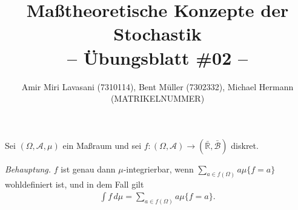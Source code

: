 \documentclass[10pt]{article}
\newcommand{\R}{\mathbb{R}}
\newcommand{\beh}{\textit{Behauptung. }}
\newenvironment{Aufgabe}[2][Aufgabe]{\begin{trivlist}
\item[\hskip \labelsep {\bfseries #1}\hskip \labelsep {\bfseries #2.}]}{\end{trivlist}}
\begin{document}
 
\title{ \textbf{Maßtheoretische Konzepte der Stochastik \\ -- Übungsblatt \#02 --} }

\author{Amir Miri Lavasani (7310114), Bent Müller (7302332),
        Michael Hermann (MATRIKELNUMMER)} \maketitle

 
\begin{Aufgabe}{2}
    Sei $(\Omega,\mathcal{A},\mu)$ ein Maßraum und sei $f: (\Omega,\mathcal{A})\to (\bar{\R} , \bar{\mathcal{B}})$
    diskret. 
\end{Aufgabe}

\beh $f$ ist genau dann $\mu$-integrierbar, wenn $\sum_{a\in f(\Omega)} a\mu\{f=a\}$ 
wohldefiniert ist, und in dem Fall gilt 
  \begin{align*}
    \int f \,d\mu = \sum_{a\in f(\Omega)} a\mu\{f=a\}.
  \end{align*}
\end{document}
